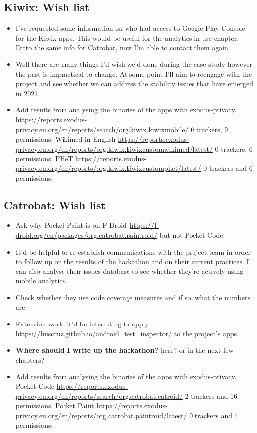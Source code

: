 \subsection*{Kiwix: Wish list}
{\small
\begin{itemize}
    \itemsep0em
    \item I've requested some information on who had access to Google Play Console for the Kiwix apps. This would be useful for the analytics-in-use chapter. Ditto the same info for Catrobat, now I'm able to contact them again.
    \item Well there are many things I'd wish we'd done during the case study however the past is impractical to change. At some point I'll aim to reengage with the project and see whether we can address the stability issues that have emerged in 2021.
    \item Add results from analysing the binaries of the apps with exodus-privacy. \url{https://reports.exodus-privacy.eu.org/en/reports/search/org.kiwix.kiwixmobile/} 0 trackers, 9 permissions. Wikimed in English \url{https://reports.exodus-privacy.eu.org/en/reports/org.kiwix.kiwixcustomwikimed/latest/} 0 trackers, 6 permissions. PHeT \url{https://reports.exodus-privacy.eu.org/en/reports/org.kiwix.kiwixcustomphet/latest/} 0 trackers and 6 permissions.
\end{itemize}
}

\subsection*{Catrobat: Wish list}
{\small
\begin{itemize}
    \itemsep0em
    \item Ask why Pocket Paint is on F-Droid~\url{https://f-droid.org/en/packages/org.catrobat.paintroid/} but not Pocket Code.
    \item It'd be helpful to re-establish communications with the project team in order to follow up on the results of the hackathon and on their current practices. I can also analyse their issues database to see whether they're actively using mobile analytics.
    \item Check whether they use code coverage measures and if so, what the numbers are.
    \item Extension work: it'd be interesting to apply \url{https://luiscruz.github.io/android_test_inspector/} to the project's apps.
    \item \textbf{Where should I write up the hackathon?} here? or in the next few chapters?
    \item Add results from analysing the binaries of the apps with exodus-privacy. Pocket Code \url{https://reports.exodus-privacy.eu.org/en/reports/search/org.catrobat.catroid/} 2 trackers and 16 permissions. Pocket Paint \url{https://reports.exodus-privacy.eu.org/en/reports/org.catrobat.paintroid/latest/} 0 trackers and 4 permissions.
\end{itemize}
}  %


